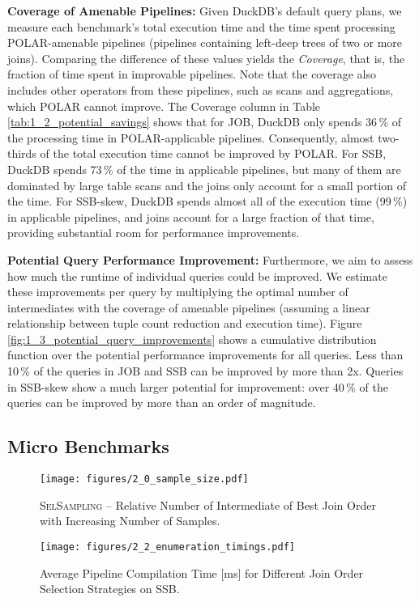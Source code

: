 \textbf{Coverage of Amenable Pipelines:} Given DuckDB's default query plans, we measure each benchmark's total execution time and the time spent processing POLAR-amenable pipelines (\ie pipelines containing left-deep trees of two or more joins). Comparing the difference of these values yields the \textit{Coverage}, that is, the fraction of time spent in improvable pipelines. Note that the coverage also includes other operators from these pipelines, such as scans and aggregations, which POLAR cannot improve. The Coverage column in Table \ref{tab:1_2_potential_savings} shows that for JOB, DuckDB only spends 36\,\% of the processing time in POLAR-applicable pipelines. Consequently, almost two-thirds of the total execution time cannot be improved by POLAR. For SSB, DuckDB spends 73\,\% of the time in applicable pipelines, but many of them are dominated by large table scans and the joins only account for a small portion of the time. For SSB-skew, DuckDB spends almost all of the execution time (99\,\%) in applicable pipelines, and joins account for a large fraction of that time, providing substantial room for performance improvements.

\textbf{Potential Query Performance Improvement:} Furthermore, we aim to assess how much the runtime of individual queries could be improved. We estimate these improvements per query by multiplying the optimal number of intermediates with the coverage of amenable pipelines (assuming a linear relationship between tuple count reduction and execution time). Figure \ref{fig:1_3_potential_query_improvements} shows a cumulative distribution function over the potential performance improvements for all queries. Less than 10\,\% of the queries in JOB and SSB can be improved by more than 2x. Queries in SSB-skew show a much larger potential for improvement: over 40\,\% of the queries can be improved by more than an order of magnitude.

\subsection{Micro Benchmarks}
\label{sec:microbench}

\begin{figure}
    \begin{minipage}[t]{0.48\linewidth}
        \texttt{[image: figures/2\_0\_sample\_size.pdf]}
        \vspace{-0.65cm}
        \caption{\textsc{SelSampling} -- Relative Number of Intermediate of Best Join Order with Increasing Number of Samples.}
        \label{fig:2_0_sample_size}
    \end{minipage}%
        \hfill%
    \begin{minipage}[t]{0.48\linewidth}
        \texttt{[image: figures/2\_2\_enumeration\_timings.pdf]}
        \vspace{-0.65cm}
        \caption{Average Pipeline Compilation Time [ms] for Different Join Order Selection Strategies on SSB.}
				\label{fig:2_2_enumeration_timings}
    \end{minipage}
		\vspace{-0.5cm}
\end{figure}

